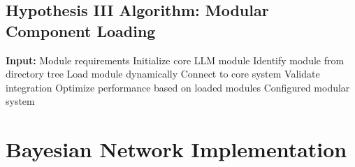 \documentclass[11pt,a4paper]{article}
\begin{document}
\subsection{Hypothesis III Algorithm: Modular Component Loading}

\begin{algorithm}[H]
\caption{Dynamic Module Loading}
\begin{algorithmic}[1]
    \STATE \textbf{Input:} Module requirements
    \STATE Initialize core LLM module
        \STATE Identify module from directory tree
        \STATE Load module dynamically
        \STATE Connect to core system
        \STATE Validate integration
    \ENDFOR
    \STATE Optimize performance based on loaded modules
    \RETURN Configured modular system
\end{algorithmic}
\end{algorithm}

\section{Bayesian Network Implementation}
\end{document}
